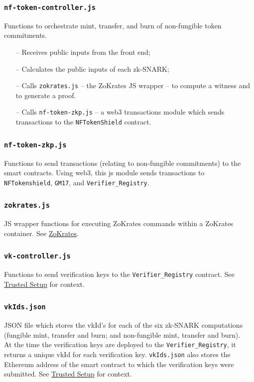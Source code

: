 \documentclass{article}
\begin{document}
\subsubsection{\texttt{nf-token-controller.js}}
\label{sec:nf-token-controller}
Functions to orchestrate mint, transfer, and burn of non-fungible token commitments.
\begin{itemize}
  \item[--] Receives public inputs from the front end;
  \item[--] Calculates the public inputs of each zk-SNARK;
  \item[--] Calls \texttt{zokrates.js} -- the ZoKrates JS wrapper -- to compute a witness and to generate a proof.
  \item[--] Calls \texttt{nf-token-zkp.js} -- a web3 transactions module which sends transactions to the \texttt{NFTokenShield} contract.
\end{itemize}

\subsubsection{\texttt{nf-token-zkp.js}}
\label{sec:nf-token-zkp}
Functions to send transactions (relating to non-fungible commitments) to the smart contracts. Using web3, this js module sends transactions to \texttt{NFTokenshield}, \texttt{GM17}, and \texttt{Verifier\_Registry}.

\subsubsection{\texttt{zokrates.js}}
JS wrapper functions for executing ZoKrates commands within a ZoKrates container. See \hyperref[sec:zokrates]{ZoKrates}.

\subsubsection{\texttt{vk-controller.js}}
Functions to send verification keys to the \texttt{Verifier\_Registry} contract. See \hyperref[sec:trustedSetup]{Trusted Setup} for context.

\subsubsection{\texttt{vkIds.json}}
JSON file which stores the vkId's for each of the six zk-SNARK computations (fungible mint, transfer and burn; and non-fungible mint, transfer and burn).\\
At the time the verification keys are deployed to the \texttt{Verifier\_Registry}, it returns a unique vkId for each verification key. \texttt{vkIds.json} also stores the Ethereum address of the smart contract to which the verification keys were submitted. See \hyperref[sec:trustedSetup]{Trusted Setup} for context.
\end{document}
